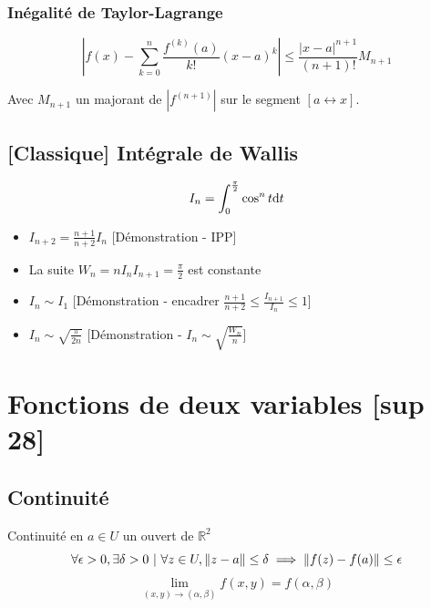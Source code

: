 \documentclass[openany]{book}
\begin{document}
\subsubsection{Inégalité de Taylor-Lagrange}
\[ \left |f(x) - \sum_{k=0}^{n} \frac{f^{(k)}(a)}{k!}(x-a)^k \right | \leq \frac{|x-a|^{n+1}}{(n+1)!} M_{n+1} \]

Avec $M_{n+1}$ un majorant de $|f^{(n+1)}|$ sur le segment $[a \leftrightarrow x]$.

\subsection{[Classique] Intégrale de Wallis}
\[ I_n = \int_{0}^{\frac{\pi}{2}} \cos^n t \text{d}t \]

\begin{itemize}
    \item $I_{n+2} = \frac{n+1}{n+2} I_n$ [Démonstration - IPP]
    \item La suite $W_n = nI_nI_{n+1} = \frac{\pi}{2}$ est constante
    \item $I_n \sim I_{1}$ [Démonstration - encadrer $\frac{n+1}{n+2} \leq \frac{I_{n+1}}{I_n} \leq 1$]
    \item $I_n \sim \sqrt{\frac{\pi}{2n}}$ [Démonstration - $I_n \sim \sqrt{\frac{W_n}{n}}$]
\end{itemize}

\clearpage

\section{Fonctions de deux variables [sup 28]}

\subsection{Continuité}
Continuité en $a \in U$ un ouvert de $\mathbb{R}^2$ 
\[ \forall \epsilon > 0, \exists \delta > 0 \text{ } | \text{ } \forall z \in U, \|z-a\| \leq \delta \implies \| f(z) - f(a) \| \leq \epsilon \]
\[ \lim_{(x, y) \rightarrow (\alpha, \beta)} f(x, y) = f(\alpha, \beta) \]
\end{document}
